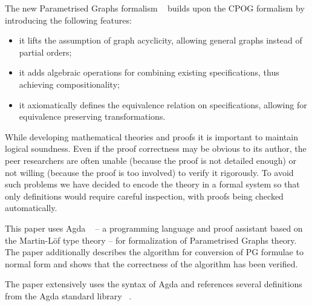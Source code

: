 The new Parametrised Graphs formalism ~\cite{2011_mokhov_pg} builds upon the CPOG formalism by introducing the following features:
\begin{itemize}
\item{it lifts the assumption of graph acyclicity, allowing general graphs instead of partial orders;}
\item{it adds algebraic operations for combining existing specifications, thus achieving compositionality;}
\item{it axiomatically defines the equivalence relation on specifications, allowing for equivalence preserving transformations.}
\end{itemize}

While developing mathematical theories and proofs it is important to maintain logical soundness.
Even if the proof correctness may be obvious to its author, the peer researchers are often unable (because the proof is not detailed enough) or not willing (because the proof is too involved) to verify it rigorously.
To avoid such problems we have decided to encode the theory in a formal system so that only definitions would require careful inspection, with proofs being checked automatically.

This paper uses Agda ~\cite{norell:thesis} -- a programming language and proof assistant based on the Martin-Löf type theory -- for formalization of
Parametrised Graphs theory. The paper additionally describes the algorithm 
for conversion of PG formulae to normal form and shows that the correctness of the algorithm has been verified.

The paper extensively uses the syntax of Agda and references several definitions from the Agda standard library ~\cite{agdalib}.
